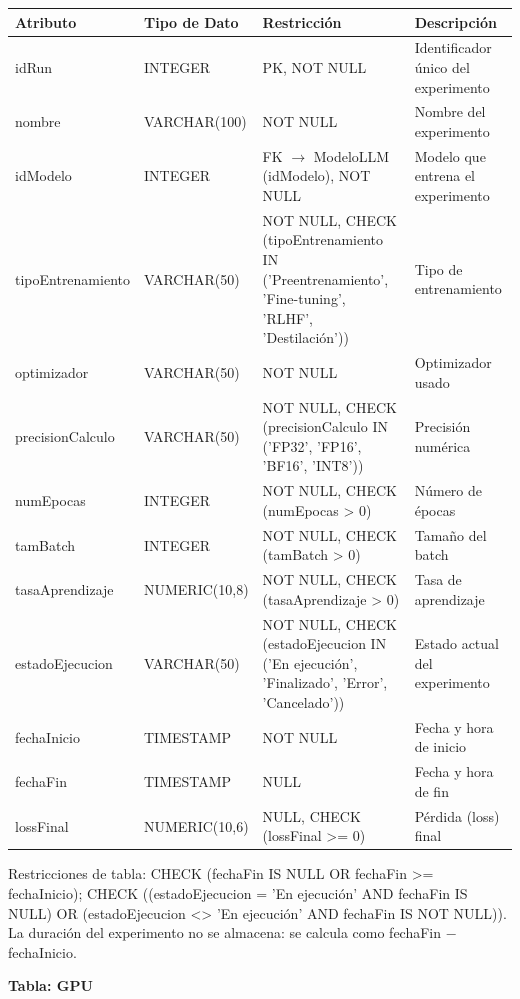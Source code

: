 \documentclass[12pt,a4paper]{article}
\begin{document}
\begin{longtable}{|>{\raggedright\arraybackslash}p{3.45cm}|>{\raggedright\arraybackslash}p{3.45cm}|>{\raggedright\arraybackslash}p{3.45cm}|>{\raggedright\arraybackslash}p{3.45cm}|}
\hline
\textbf{Atributo} & \textbf{Tipo de Dato} & \textbf{Restricción} & \textbf{Descripción} \\
\hline
idRun & INTEGER & PK, NOT NULL & Identificador único del experimento \\
\hline
nombre & VARCHAR(100) & NOT NULL & Nombre del experimento \\
\hline
idModelo & INTEGER & FK $\rightarrow$ ModeloLLM (idModelo), NOT NULL & Modelo que entrena el experimento \\
\hline
tipoEntrenamiento & VARCHAR(50) & NOT NULL, CHECK (tipoEntrenamiento IN ('Preentrenamiento', 'Fine-tuning', 'RLHF', 'Destilación')) & Tipo de entrenamiento \\
\hline
optimizador & VARCHAR(50) & NOT NULL & Optimizador usado \\
\hline
precisionCalculo & VARCHAR(50) & NOT NULL, CHECK (precisionCalculo IN ('FP32', 'FP16', 'BF16', 'INT8')) & Precisión numérica \\
\hline
numEpocas & INTEGER & NOT NULL, CHECK (numEpocas > 0) & Número de épocas \\
\hline
tamBatch & INTEGER & NOT NULL, CHECK (tamBatch > 0) & Tamaño del batch \\
\hline
tasaAprendizaje & NUMERIC(10,8) & NOT NULL, CHECK (tasaAprendizaje > 0) & Tasa de aprendizaje \\
\hline
estadoEjecucion & VARCHAR(50) & NOT NULL, CHECK (estadoEjecucion IN ('En ejecución', 'Finalizado', 'Error', 'Cancelado')) & Estado actual del experimento \\
\hline
fechaInicio & TIMESTAMP & NOT NULL & Fecha y hora de inicio \\
\hline
fechaFin & TIMESTAMP & NULL & Fecha y hora de fin \\
\hline
lossFinal & NUMERIC(10,6) & NULL, CHECK (lossFinal >= 0) & Pérdida (loss) final \\
\hline
\end{longtable}

Restricciones de tabla: CHECK (fechaFin IS NULL OR fechaFin >= fechaInicio); CHECK ((estadoEjecucion = 'En ejecución' AND fechaFin IS NULL) OR (estadoEjecucion <> 'En ejecución' AND fechaFin IS NOT NULL)). La duración del experimento no se almacena: se calcula como fechaFin $-$ fechaInicio.

\textbf{Tabla: GPU}
\end{document}
